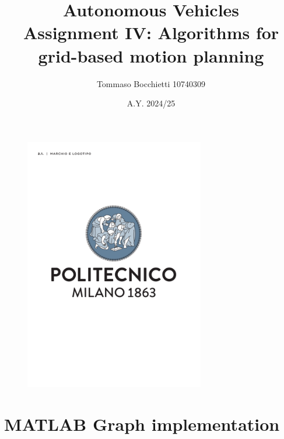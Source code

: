 \documentclass{assignment}
\begin{document}
\title{Autonomous Vehicles \\ Assignment IV: Algorithms for grid-based motion planning}
\author{Tommaso Bocchietti 10740309}
\date{A.Y. 2024/25}

\maketitle

\begin{figure}[H]
    \centering
    \includegraphics[width=0.7\textwidth]{./pdf/Polimi_logo_coverpage.pdf}
    \label{fig:Polimi_logo}
\end{figure}

\clearpage
\tableofcontents
\listoffigures

\clearpage





% 
% 

\clearpage
\appendix
\section{MATLAB Graph implementation}
\label{sec:graph_implementation}
\end{document}
